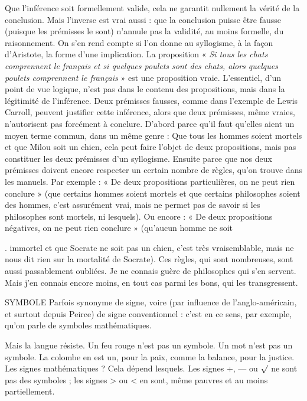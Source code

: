 Que l’inférence soit formellement valide, cela ne garantit nullement la
vérité de la conclusion. Mais l’inverse est vrai aussi : que la conclusion puisse
être fausse (puisque les prémisses le sont) n’annule pas la validité, au moins formelle,
du raisonnement. On s’en rend compte si l’on donne au syllogisme, à la
façon d’Aristote, la forme d’une implication. La proposition « {\it Si tous les chats
comprennent le français et si quelques poulets sont des chats, alors quelques poulets
comprennent le français} » est une proposition vraie. L'essentiel, d’un point de
vue logique, n’est pas dans le contenu des propositions, mais dans la légitimité
de l’inférence. Deux prémisses fausses, comme dans l'exemple de Lewis Carroll,
peuvent justifier cette inférence, alors que deux prémisses, même vraies, n’autorisent
pas forcément à conclure. D’abord parce qu’il faut qu’elles aient un
moyen terme commun, dans un même genre : Que tous les hommes soient
mortels et que Milou soit un chien, cela peut faire l’objet de deux propositions,
mais pas constituer les deux prémisses d’un syllogisme. Ensuite parce que nos
deux prémisses doivent encore respecter un certain nombre de règles, qu’on
trouve dans les manuels. Par exemple : « De deux propositions particulières, on
ne peut rien conclure » (que certains hommes soient mortels et que certains
philosophes soient des hommes, c’est assurément vrai, mais ne permet pas de
savoir si les philosophes sont mortels, ni lesquels). Ou encore : « De deux propositions
négatives, on ne peut rien conclure » (qu'aucun homme ne soit

. immortel et que Socrate ne soit pas un chien, c’est très vraisemblable, mais ne
nous dit rien sur la mortalité de Socrate). Ces règles, qui sont nombreuses, sont
aussi passablement oubliées. Je ne connais guère de philosophes qui s’en servent.
Mais j’en connais encore moins, en tout cas parmi les bons, qui les transgressent.

SYMBOLE Parfois synonyme de signe, voire (par influence de l’anglo-américain,
et surtout depuis Peirce) de signe conventionnel : c’est en
ce sens, par exemple, qu’on parle de symboles mathématiques.

Mais la langue résiste. Un feu rouge n’est pas un symbole. Un mot n’est pas
un symbole. La colombe en est un, pour la paix, comme la balance, pour la justice.
Les signes mathématiques ? Cela dépend lesquels. Les signes +, — ou $\surd$ ne
sont pas des symboles ; les signes > ou < en sont, même pauvres et au moins
partiellement.

